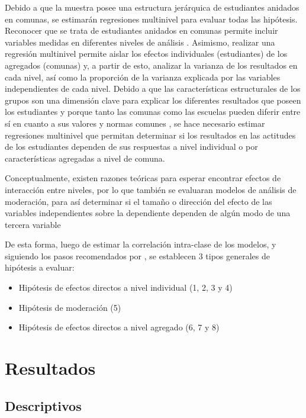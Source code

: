 \documentclass[12pt,twoside]{templates/facsothesis}
\begin{document}
Debido a que la muestra posee una estructura jerárquica de estudiantes anidados en comunas, se estimarán regresiones multinivel para evaluar todas las hipótesis. Reconocer que se trata de estudiantes anidados en comunas permite incluir variables medidas en diferentes niveles de análisis \citep{aguinis_BestPractice_2013}. Asimismo, realizar una regresión multinivel permite aislar los efectos individuales (estudiantes) de los agregados (comunas) y, a partir de esto, analizar la varianza de los resultados en cada nivel, así como la proporción de la varianza explicada por las variables independientes de cada nivel. Debido a que las características estructurales de los grupos son una dimensión clave para explicar los diferentes resultados que poseen los estudiantes \citep{trevino_Influence_2018} y porque tanto las comunas como las escuelas pueden diferir entre sí en cuanto a sus valores y normas comunes \citep{bayramozdemir_How_2020}, se hace necesario estimar regresiones multinivel que permitan determinar si los resultados en las actitudes de los estudiantes dependen de sus respuestas a nivel individual o por características agregadas a nivel de comuna.

Conceptualmente, existen razones teóricas para esperar encontrar efectos de interacción entre niveles, por lo que también se evaluaran modelos de análisis de moderación, para así determinar si el tamaño o dirección del efecto de las variables independientes sobre la dependiente dependen de algún modo de una tercera variable \citep{hayes_introduction_2022}

De esta forma, luego de estimar la correlación intra-clase de los modelos, y siguiendo los pasos recomendados por \citet{aguinis_BestPractice_2013}, se establecen 3 tipos generales de hipótesis a evaluar:

\begin{itemize}
\item
  Hipótesis de efectos directos a nivel individual (1, 2, 3 y 4)
\item
  Hipótesis de moderación (5)
\item
  Hipótesis de efectos directos a nivel agregado (6, 7 y 8)
\end{itemize}

\hypertarget{resultados}{%
\chapter{Resultados}\label{resultados}}

\hypertarget{descriptivos}{%
\section{Descriptivos}\label{descriptivos}}
\end{document}
